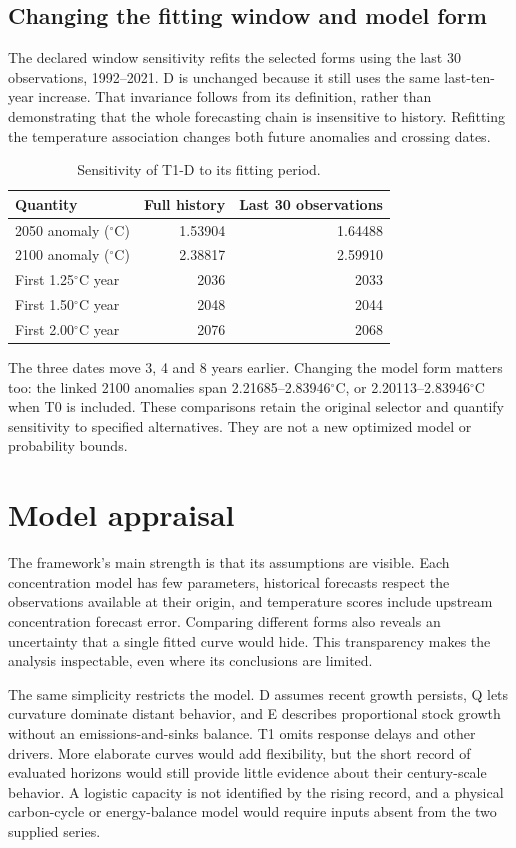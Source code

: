 \documentclass[11pt,a4paper]{article}
\newcommand{\p}[2]{#2\par}
\newcommand{\txt}[2]{#2}
\newcommand{\degC}{\ensuremath{{}^{\circ}\mathrm{C}}}
\begin{document}
\subsection{Changing the fitting window and model form}
\p{SEN01}{The declared window sensitivity refits the selected forms using the last 30 observations, 1992--2021. D is unchanged because it still uses the same last-ten-year increase. That invariance follows from its definition, rather than demonstrating that the whole forecasting chain is insensitive to history. Refitting the temperature association changes both future anomalies and crossing dates.}
\begin{table}[H]\centering\small
\caption{\txt{TC11}{Sensitivity of T1-D to its fitting period.}}\label{tab:window}
\begin{tabular}{lrr}\toprule
Quantity & Full history & Last 30 observations\\\midrule
2050 anomaly (\degC) & 1.53904 & 1.64488\\
2100 anomaly (\degC) & 2.38817 & 2.59910\\
First 1.25\degC{} year & 2036 & 2033\\
First 1.50\degC{} year & 2048 & 2044\\
First 2.00\degC{} year & 2076 & 2068\\\bottomrule
\end{tabular}
\end{table}
\p{SEN02}{The three dates move 3, 4 and 8 years earlier. Changing the model form matters too: the linked 2100 anomalies span 2.21685--2.83946\degC{}, or 2.20113--2.83946\degC{} when T0 is included. These comparisons retain the original selector and quantify sensitivity to specified alternatives. They are not a new optimized model or probability bounds.}
\section{Model appraisal}\label{sec:appraisal}
\p{APP01}{The framework's main strength is that its assumptions are visible. Each concentration model has few parameters, historical forecasts respect the observations available at their origin, and temperature scores include upstream concentration forecast error. Comparing different forms also reveals an uncertainty that a single fitted curve would hide. This transparency makes the analysis inspectable, even where its conclusions are limited.}
\p{APP02}{The same simplicity restricts the model. D assumes recent growth persists, Q lets curvature dominate distant behavior, and E describes proportional stock growth without an emissions-and-sinks balance. T1 omits response delays and other drivers. More elaborate curves would add flexibility, but the short record of evaluated horizons would still provide little evidence about their century-scale behavior. A logistic capacity is not identified by the rising record, and a physical carbon-cycle or energy-balance model would require inputs absent from the two supplied series.}
\end{document}
